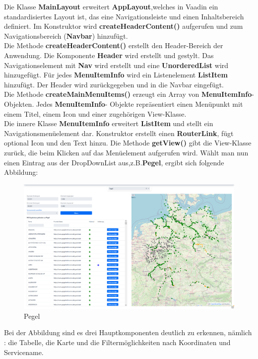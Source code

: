 \documentclass[a4paper,12pt]{scrreprt}
\begin{document}
Die Klasse \textbf{MainLayout} erweitert \textbf{AppLayout},welches in Vaadin ein standardisiertes Layout ist, das eine Navigationsleiste und einen Inhaltsbereich definiert. Im Konstruktor wird \textbf{createHeaderContent()} aufgerufen und zum Navigationsbereich (\textbf{Navbar}) hinzufügt.\\ 

Die Methode \textbf{createHeaderContent()} erstellt den Header-Bereich der Anwendung. Die Komponente \textbf{Header} wird erstellt und gestylt. Das Navigationselement mit \textbf{Nav} wird erstellt und eine \textbf{UnorderedList} wird hinzugefügt. Für jedes \textbf{MenuItemInfo} wird ein Listenelement \textbf{ListItem} hinzufügt. Der Header wird zurückgegeben und in die Navbar eingefügt.\\

Die Methode \textbf{createMainMenuItems()} erzeugt ein Array von \textbf{MenuItemInfo}- Objekten. Jedes \textbf{MenuItemInfo}- Objekte repräsentiert einen Menüpunkt mit einem Titel, einem Icon und einer zugehörigen View-Klasse. \\

Die innere Klasse \textbf{MenuItemInfo} erweitert \textbf{ListItem} und stellt ein Navigationsmenüelement dar. Konstruktor erstellt einen \textbf{RouterLink}, fügt optional Icon und den Text hinzu. Die Methode \textbf{getView()} gibt die View-Klasse zurück, die beim Klicken auf das Menüelement aufgerufen wird.
\clearpage
Wählt man nun einen Eintrag aus der DropDownList aus,z.B.\textbf{Pegel}, ergibt sich folgende Abbildung:
\begin{figure}[H]
	 \centering
	\includegraphics[width=18cm]{pegel.png}
	\caption{\label{pegel:}Pegel}
\end{figure}
Bei der Abbildung sind es drei Hauptkomponenten deutlich zu erkennen, nämlich : die Tabelle, die Karte und die Filtermöglichkeiten nach Koordinaten und Servicename.
\end{document}
